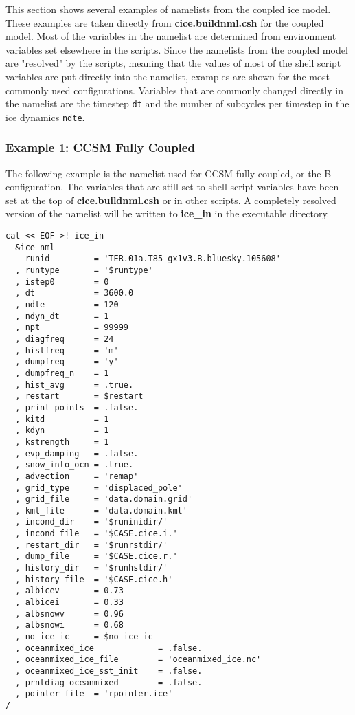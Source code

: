
This section shows several examples of namelists from the coupled
ice model.  These examples are taken directly from {\bf cice.buildnml.csh}
for the coupled model.  
Most of the variables in the namelist are determined from environment variables
set elsewhere in the scripts. Since the namelists from the coupled model are
"resolved" by the scripts, meaning that the values of most of the shell script
variables are put directly into the namelist, examples are shown for the most
commonly used configurations.  Variables that are commonly changed directly in
the namelist are the timestep {\tt dt} and the number of subcycles per timestep
in the ice dynamics {\tt ndte}. 

\subsubsection {Example 1: CCSM Fully Coupled}
\label{example1_nml}

The following example is the namelist used for CCSM fully coupled, or
the B configuration.  The variables that are still set to shell script
variables have been set at the top of {\bf cice.buildnml.csh}
or in other scripts.  A completely resolved version of the namelist will
be written to {\bf ice\_in} in the executable directory.

\begin{verbatim}
cat << EOF >! ice_in
  &ice_nml
    runid         = 'TER.01a.T85_gx1v3.B.bluesky.105608'
  , runtype       = '$runtype'
  , istep0        = 0
  , dt            = 3600.0
  , ndte          = 120
  , ndyn_dt       = 1
  , npt           = 99999
  , diagfreq      = 24
  , histfreq      = 'm'
  , dumpfreq      = 'y'
  , dumpfreq_n    = 1
  , hist_avg      = .true.
  , restart       = $restart
  , print_points  = .false.
  , kitd          = 1
  , kdyn          = 1
  , kstrength     = 1
  , evp_damping   = .false.
  , snow_into_ocn = .true.
  , advection     = 'remap'
  , grid_type     = 'displaced_pole'
  , grid_file     = 'data.domain.grid'
  , kmt_file      = 'data.domain.kmt'
  , incond_dir    = '$runinidir/'
  , incond_file   = '$CASE.cice.i.'
  , restart_dir   = '$runrstdir/'
  , dump_file     = '$CASE.cice.r.'
  , history_dir   = '$runhstdir/'
  , history_file  = '$CASE.cice.h'
  , albicev       = 0.73
  , albicei       = 0.33
  , albsnowv      = 0.96
  , albsnowi      = 0.68
  , no_ice_ic     = $no_ice_ic
  , oceanmixed_ice             = .false.
  , oceanmixed_ice_file        = 'oceanmixed_ice.nc'
  , oceanmixed_ice_sst_init    = .false.
  , prntdiag_oceanmixed        = .false.
  , pointer_file  = 'rpointer.ice'
/
\end{verbatim}

